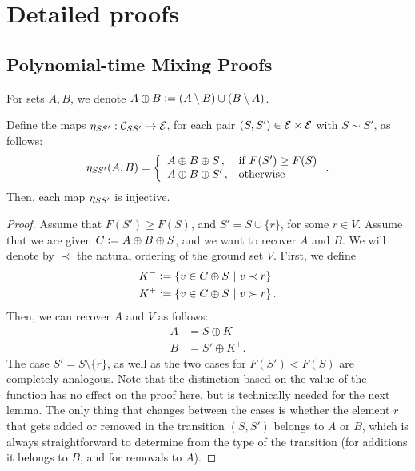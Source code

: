 \appendix
\chapter{Detailed proofs}

\section{Polynomial-time Mixing Proofs}
For sets $A, B$, we denote $A \oplus B \defeq (A \setminus B)\cup(B \setminus A)$.

\let\oldthelemma\thelemma
\renewcommand{\thelemma}{A.1}
\begin{lemma} \label{lem:inj}
Define the maps $\ess : \mathcal{C}_{SS'} \to \ss$, for each pair $(S, S') \in \ss \times \ss$ with $S \sim S'$, as follows:
\begin{align*}
  \ess(A, B) = \twopartdefo{A \oplus B \oplus S}{F(S') \geq F(S)}{A \oplus B \oplus S'}.
\end{align*}
Then, each map $\ess$ is injective.
\end{lemma}

\begin{proof}
  Assume that $F(S') \geq F(S)$, and $S' = S \cup \{r\}$, for some $r \in V$.
  Assume that we are given $C \defeq A \oplus B \oplus S$, and we want to recover $A$ and $B$.
  We will denote by $\prec$ the natural ordering of the ground set $V$.
  First, we define
  \begin{align*}
    K^- &\defeq \sdef{v \in C \oplus S}{v \prec r}\\
    K^+ &\defeq \sdef{v \in C \oplus S}{v \succ r}.
  \end{align*}
  Then, we can recover $A$ and $V$ as follows:
  \begin{align*}
    A &= S \oplus K^-\\
    B &= S' \oplus K^+.
  \end{align*}
  The case $S' = S \setminus \{r\}$, as well as the two cases for $F(S') < F(S)$ are completely analogous.
  Note that the distinction based on the value of the function has no effect on the proof here, but is technically needed for the next lemma.
  The only thing that changes between the cases is whether the element $r$ that gets added or removed in the transition $(S, S')$ belongs to $A$ or $B$, which is always straightforward to determine from the type of the transition (for additions it belongs to $B$, and for removals to $A$).
\end{proof}
\let\thelemma\oldthelemma

